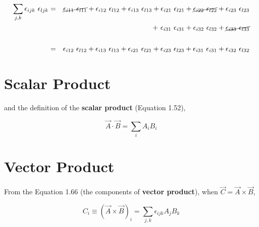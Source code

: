 \documentclass[a4paper]{article}
\begin{document}
\begin{eqnarray*}
	\sum_{j,k} \epsilon_{ijk} \ \epsilon_{ljk} & = & \cancel{\epsilon_{i11} \ \epsilon_{l11}} + \epsilon_{i12} \ \epsilon_{l12} + \epsilon_{i13} \ \epsilon_{l13} + \epsilon_{i21} \ \epsilon_{l21} + \cancel{\epsilon_{i22} \ \epsilon_{l22}} + \epsilon_{i23} \ \epsilon_{l23} \\
	&  & + \ \epsilon_{i31} \ \epsilon_{i31} + \epsilon_{i32} \ \epsilon_{l32} + \cancel{\epsilon_{i33} \ \epsilon_{l33}} \\\\
	& = & \epsilon_{i12} \ \epsilon_{l12} + \epsilon_{i13} \ \epsilon_{l13} + \epsilon_{i21} \ \epsilon_{l21} + \epsilon_{i23} \ \epsilon_{l23} + \epsilon_{i31} \ \epsilon_{i31} + \epsilon_{i32} \ \epsilon_{l32}
\end{eqnarray*}

\section{Scalar Product}

and the definition of the \textbf{scalar product} (Equation 1.52),

\begin{equation}
  \vec{A}\cdot\vec{B} = \sum_i A_i B_i \tag{1.52}
\end{equation}


\section{Vector Product}

From the Equation 1.66 (the components of \textbf{vector product}), when $\vec{C} = \vec{A} \times \vec{B}$,

\begin{equation}
	C_i \equiv (\vec{A}\times\vec{B})_i = \sum_{j,k} \epsilon_{ijk}A_jB_k \tag{1.66}
\end{equation}
\end{document}
